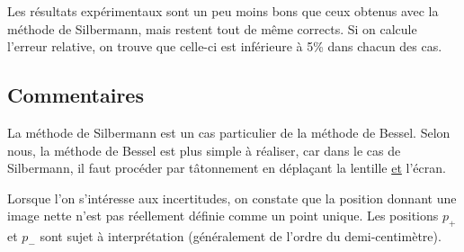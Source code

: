 \documentclass[12pt,a4paper]{article}
\begin{document}
	Les résultats expérimentaux sont un peu moins bons que ceux obtenus avec la méthode de Silbermann, mais restent tout de même corrects. Si on calcule l'erreur relative, on trouve que celle-ci est inférieure à 5\% dans chacun des cas.
	\subsection{Commentaires}
	La méthode de Silbermann est un cas particulier de la méthode de Bessel. Selon nous, la méthode de Bessel est plus simple à réaliser, car dans le cas de Silbermann, il faut procéder par tâtonnement en déplaçant la lentille \underline{et} l'écran.
	
	Lorsque l'on s'intéresse aux incertitudes, on constate que la position donnant une image nette n'est pas réellement définie comme un point unique. Les positions $p_+$ et $p_-$ sont sujet à interprétation (généralement de l'ordre du demi-centimètre).\\
	
\end{document}
